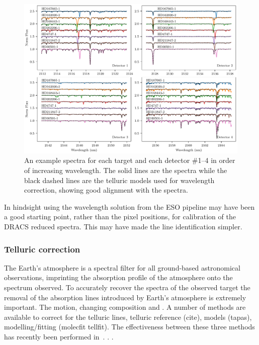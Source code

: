 \begin{figure}
    \centering
    \includegraphics[width=1\linewidth]{figures/reduction/Spectra_examples}
    \caption{An example spectra for each target and each detector \#1--4 in order of increasing wavelength. The solid lines are the spectra while the black dashed lines are the telluric models used for wavelength correction, showing good alignment with the spectra.}
    \label{fig:spectraexamples}
\end{figure}




In hindsight using the wavelength solution from the {ESO} pipeline may have been a good starting point, rather than the pixel positions, for calibration of the {DRACS} reduced spectra. This may have made the line identification simpler.


\subsubsection{Telluric correction}
\label{subsec:telluric_correction}
The Earth's atmosphere is a spectral filter for all ground-based astronomical observations, imprinting the absorption profile of the atmosphere onto the spectrum observed. To accurately recover the spectra of the observed target the removal of the absorption lines introduced by Earth's atmosphere is extremely important. The motion, changing composition and .
A number of methods are available to correct for the telluric lines, telluric reference (cite), models (tapas), modelling/fitting (molecfit tellfit). The effectiveness between these three methods has recently been performed in~\cite{ulmer-moll_telluric_2018}. . .

